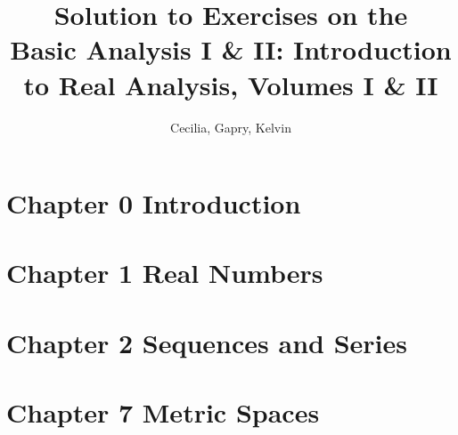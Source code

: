 \documentclass{article}
\title{Solution to Exercises on the \\Basic Analysis I \& II: Introduction to Real Analysis, Volumes I \& II}
\author{Cecilia, Gapry, Kelvin}
\begin{document}
\maketitle

\section*{Chapter 0 Introduction}


\section*{Chapter 1 Real Numbers}






\section*{Chapter 2 Sequences and Series}







\section*{Chapter 7 Metric Spaces}


\end{document}
